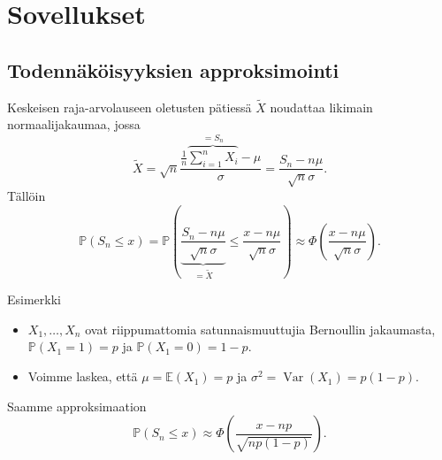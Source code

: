 \documentclass{beamer}
\DeclareMathOperator{\var}{Var}
\begin{document}

\section{Sovellukset}


\subsection{Todennäköisyyksien approksimointi}


\begin{frame}
  Keskeisen raja-arvolauseen oletusten pätiessä $\tilde X$ noudattaa likimain
  normaalijakaumaa, jossa
  \begin{equation*}
    \tilde X = \sqrt{n}\frac{\frac{1}{n}
    \overbrace{\sum_{i=1}^n X_i}^{=S_n} - \mu}{\sigma}
    = \frac{S_n - n\mu}{\sqrt{n}\sigma}.
  \end{equation*}
  \pause
  Tällöin
  \begin{equation*}
    \mathbb{P}\left(S_n\leq x\right) = \mathbb{P}
    \left(\underbrace{\frac{S_n - n\mu}{\sqrt{n}\sigma}}_{= \tilde X}\leq
    \frac{x - n\mu} {\sqrt{n}\sigma}\right)\approx \Phi\left(\frac{x - n\mu}
    {\sqrt{n}\sigma}\right).
  \end{equation*}
\end{frame}


\begin{frame}{Esimerkki}
  \begin{itemize}
    \item $X_1, \ldots, X_n$ ovat riippumattomia satunnaismuuttujia Bernoullin
    jakaumasta, $\mathbb{P}\left(X_1 = 1\right) = p$ ja $\mathbb{P}\left(X_1 =
    0\right) = 1-p$.
    \pause
    \item Voimme laskea, että $\mu = \mathbb{E}\left(X_1\right) = p$ ja
    $\sigma^2 = \var\left(X_1\right) = p(1-p)$.
  \end{itemize}
  \pause
  Saamme approksimaation
  \begin{equation*}
    \mathbb{P}\left(S_n \leq x\right) \approx \Phi\left(\frac{x - np}
    {\sqrt{np(1-p)}}\right).
  \end{equation*}
\end{frame}

\end{document}

